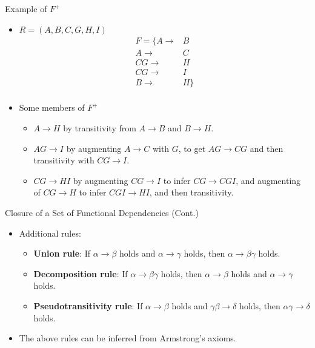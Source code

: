 \documentclass{beamer}
\begin{document}
\begin{frame}{Example of $F^+$}
    \begin{itemize}
        \item $R = (A, B, C, G, H, I)$
            \begin{equation*}
                \begin{align*}
                    F=\{A \rightarrow& B \\
                        A \rightarrow& C \\
                       CG \rightarrow& H \\
                       CG \rightarrow& I \\
                        B \rightarrow& H\} \\
                \end{align*}
            \end{equation*}
        \item Some members of $F^+$
            \begin{itemize}
                \item $A \rightarrow H$ by transitivity from $A \rightarrow B$ and $B \rightarrow H$.
                \item $AG \rightarrow I$ by augmenting $A \rightarrow C$ with $G$, to get $AG \rightarrow CG$ and then transitivity with $CG \rightarrow I$.
                \item $CG \rightarrow HI$ by augmenting $CG \rightarrow I$ to infer $CG \rightarrow CGI$, and augmenting of $CG \rightarrow H$ to infer $CGI \rightarrow HI$, and then transitivity.
            \end{itemize}
    \end{itemize}
\end{frame}

\begin{frame}{Closure of a Set of Functional Dependencies (Cont.)}
    \begin{itemize}
        \item Additional rules:
            \begin{itemize}
                \item \textbf{Union rule}: If $\alpha \rightarrow \beta$ holds and $\alpha \rightarrow \gamma$ holds, then $\alpha \rightarrow \beta \gamma$ holds.
                \item \textbf{Decomposition rule}: If $\alpha \rightarrow \beta \gamma$ holds, then $\alpha \rightarrow \beta$ holds and $\alpha \rightarrow \gamma$ holds.
                \item \textbf{Pseudotransitivity rule}: If $\alpha \rightarrow \beta$ holds and $\gamma \beta \rightarrow \delta$ holds, then $\alpha \gamma \rightarrow \delta$ holds.
            \end{itemize}
        \item The above rules can be inferred from Armstrong's axioms.
    \end{itemize}
\end{frame}
\end{document}
